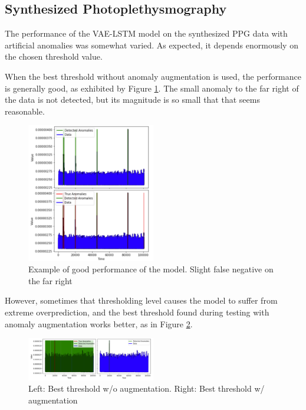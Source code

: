 \documentclass[conference]{IEEEtran}
\begin{document}
\subsection{Synthesized Photoplethysmography}
The performance of the VAE-LSTM model on the synthesized PPG data with artificial anomalies was somewhat varied. As expected, it depends enormously on the chosen threshold value.

When the best threshold without anomaly augmentation is used, the performance is generally good, as exhibited by Figure \ref{ck_fig_2}. The small anomaly to the far right of the data is not detected, but its magnitude is so small that that seems reasonable.

\begin{figure}[htbp]
    \centering
    \includegraphics[width=0.5\textwidth]{ck_fig_2.png}
    \caption{Example of good performance of the model. Slight false negative on the far right}
    \label{ck_fig_2}
\end{figure}

However, sometimes that thresholding level causes the model to suffer from extreme overprediction, and the best threshold found during testing with anomaly augmentation works better, as in Figure \ref{ck_fig_3}.

\begin{figure}[htbp]
    \centering
    \includegraphics[width=0.5\textwidth]{ck_fig_3.png}
    \caption{Left: Best threshold w/o augmentation. Right: Best threshold w/ augmentation}
    \label{ck_fig_3}
\end{figure}
\end{document}
